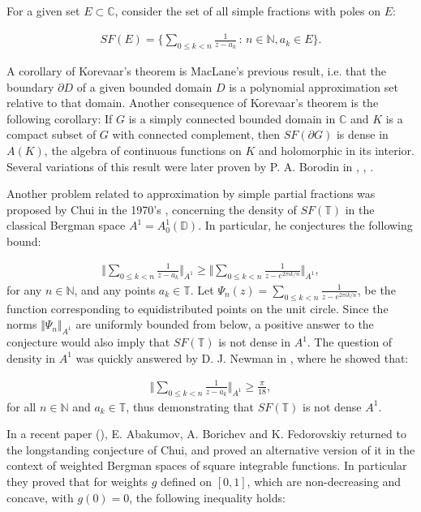\documentclass{amsart}[11pt]
\newcommand{\C}{\mathbb{C}} %
\newcommand{\N}{\mathbb{N}} %
\newcommand{\D}{\mathbb{D}} %
\newcommand{\T}{\mathbb{T}} %
\newcommand{\sbs}{\subset} %
\theoremstyle{definition}
\begin{document}
 For a given set $E \sbs \C$, consider the set of all simple fractions with poles on $E$:

 \begin{gather*}
     SF(E) = \bigg\{ \sum_{0\leq k < n} \frac{1}{z-a_k} \, : \,  n \in \N , a_k \in E \bigg\}.
 \end{gather*}

A corollary of Korevaar's theorem is MacLane's previous result, i.e. that the boundary $\partial D$ of a given bounded domain $D$ is a polynomial approximation set relative to that domain. Another consequence of Korevaar's theorem is the following corollary: If $G$ is a simply connected bounded domain in $\C$ and $K$ is a compact subset of $G$ with connected complement, then $SF(\partial G)$ is dense in $A(K)$, the algebra of continuous functions on $K$ and holomorphic in its interior. Several variations of this result were later proven by P. A. Borodin in \cite{Borodin2016}, \cite{Borodin2014}, \cite{Borodin2021}.

Another problem related to approximation by simple partial fractions was proposed by Chui in the 1970's \cite{Chui1971}, concerning the density of $SF(\T)$ in the classical Bergman space  $A^1 = A^1_0(\D) $. In particular, he conjectures the following bound:

\begin{gather*}
\bigg\Vert \sum_{0\leq k < n} \frac{1}{z-a_k} \bigg\Vert_{A^1} \geq \bigg\Vert \sum_{0 \leq k <n} \frac{1}{z-e^{2 \pi i k/n}}\bigg\Vert_{A^1},
\end{gather*}
for any $n \in \N$, and any points $a_k \in \T$. Let $\Psi_n(z) = \sum_{0 \leq k <n} \frac{1}{z-e^{2 \pi i k/n}}$, be the function corresponding to equidistributed points on the unit circle. Since the norms $\Vert \Psi_n \Vert_{A^1}$ are uniformly bounded from below, a positive answer to the conjecture would also imply that $SF(\T)$ is not dense in $A^1$. The question of density in $A^1$ was quickly answered by D. J. Newman in \cite{Newman1972}, where he showed that:

\begin{gather*}
    \bigg\Vert \sum_{0\leq k < n} \frac{1}{z-a_k} \bigg\Vert_{A^1}  \geq \frac{\pi}{18},
\end{gather*}
for all $n \in \N$ and $a_k \in \T$, thus demonstrating that $SF(\T)$ is not dense $A^1$.

In a recent paper (\cite{Abakumov2020}), E. Abakumov, A. Borichev and K. Fedorovskiy returned to the longstanding conjecture of Chui, and proved an alternative version of it in the context of weighted Bergman spaces of square integrable functions. In particular they proved that for weights $g$ defined on $[0,1]$, which are non-decreasing and concave, with $g(0)=0$, the following inequality holds:
\end{document}
